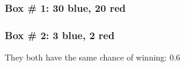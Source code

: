 \documentclass[handout]{beamer}
\begin{document}


   \begin{frame}
   \frametitle{Box \# 1: 30 blue, 20 red}
   \begin{center}
   \end{center}

   \end{frame}



   \begin{frame}
   \frametitle{Box \# 2: 3 blue, 2 red}
   \begin{center}
   \end{center}
   They both have the same chance of winning: 0.6
   \end{frame}
\end{document}
